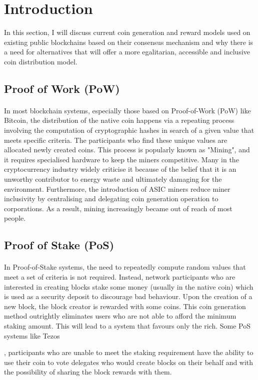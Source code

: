 \section{Introduction}
\vspace{7mm}

In this section, I will discuss current coin generation and reward models used on existing
public blockchains based on their consensus mechanism and why there is a need for alternatives that will offer a more egalitarian, accessible and inclusive coin distribution model. 
\subsection{Proof of Work (PoW)}
\paragraph{} {
	In most blockchain systems, especially those based on Proof-of-Work (PoW) like Bitcoin\cite{bitcoin}, the distribution of the native coin happens via a repeating process involving the computation of cryptographic hashes in search of a given value that meets specific criteria. The participants who find these unique values are allocated newly created coins. This process is popularly known as "Mining", and it requires specialised hardware to keep the miners competitive. Many in the cryptocurrency industry widely criticise it because of the belief that it is an unworthy contributor to energy waste and ultimately damaging for the environment. Furthermore, the introduction of ASIC miners reduce miner inclusivity by centralising and delegating coin generation operation to corporations. As a result, mining increasingly became out of reach of most people. 
	
\subsection{Proof of Stake (PoS)}
	\paragraph{}{In Proof-of-Stake systems, the need to repeatedly compute random values that meet a set of criteria is not required. Instead, network participants who are interested in creating blocks stake some money (usually in the native coin) which is used as a security deposit to discourage bad behaviour. Upon the creation of a new block, the block creator is rewarded with some coins. This coin generation method outrightly eliminates users who are not able to afford the minimum staking amount. This will lead to a system that favours only the rich.}
	Some PoS systems like Tezos\cite{liquid-pos}},  participants who are unable to meet the staking requirement have the ability to use their coin to vote delegates who would create blocks on their behalf and with the possibility of sharing the block rewards with them.

